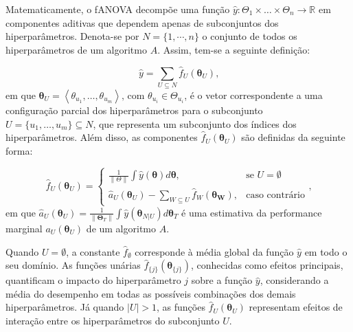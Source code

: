 \documentclass[
  12pt,
  a4paper,
]{scrreprt}
\begin{document}
\vspace{12pt}

Matematicamente, o fANOVA decompõe uma função
\(\hat y: \Theta_{1} \times \dots \times \Theta_{n} \rightarrow \mathbb{R}\)
em componentes aditivas que dependem apenas de subconjuntos dos
hiperparâmetros. Denota-se por \(N=\{1,\cdots,n\}\) o conjunto de todos
os hiperparâmetros de um algoritmo \(A\). Assim, tem-se a seguinte
definição:

\[
\hat{y} = \sum_{U \subseteq N} \hat{f}_{U} \left(\boldsymbol{\theta}_{U}\right)\text{,}
\] em que
\(\boldsymbol{\theta}_U = \left<\theta_{u_{1}}, \dots, \theta_{u_{m}}\right> \text{, com } \theta_{u_i} \in \Theta_{u_i}\),
é o vetor correspondente a uma configuração parcial dos hiperparâmetros
para o subconjunto \(U = \{u_{1}, \dots, u_{m}\} \subseteq N\), que
representa um subconjunto dos índices dos hiperparâmetros. Além disso,
as componentes \(\hat{f}_{U} \left(\boldsymbol{\theta}_{U}\right)\) são
definidas da seguinte forma:

\[
\hat{f}_{U} \left(\boldsymbol{\theta}_{U}\right)=
\begin{cases}
  \frac{1}{\|\Theta\|} \int \hat{y} \left(\boldsymbol{\theta}\right) d\boldsymbol{\theta}, & \text{se } U= \emptyset \\
  \hat{a}_{U}\left(\boldsymbol{\theta}_U\right) - \sum_{W \subseteq U} \hat{f}_{W}\left(\boldsymbol{\theta_{W}}\right), & \text{caso contrário}
\end{cases}\text{,}
\] em que
\(\hat{a}_{U}\left(\boldsymbol{\theta}_U\right) = \frac{1}{\|\boldsymbol{\Theta}_{T}\|} \int \hat{y}\left(\boldsymbol{\theta}_{N|U}\right)d \boldsymbol{\theta}_{T}\)
é uma estimativa da performance marginal
\(a_U\left(\boldsymbol{\theta}_U\right)\) de um algoritmo \(A\).

\vspace{12pt}

Quando \(U = \emptyset\), a constante
\(\hat{f}_{\emptyset}\)\hspace{0pt} corresponde à média global da função
\(\hat y\)\hspace{0pt} em todo o seu domínio. As funções unárias
\(\hat{f}_{\{j\}}\left(\boldsymbol{\theta}_{\{j\}}\right)\), conhecidas
como efeitos principais, quantificam o impacto do hiperparâmetro \(j\)
sobre a função \(\hat y\)\hspace{0pt}, considerando a média do
desempenho em todas as possíveis combinações dos demais hiperparâmetros.
Já quando \(|U| > 1\), as funções
\(\hat{f}_{U}\left(\boldsymbol{\theta}_U\right)\) representam efeitos de
interação entre os hiperparâmetros do subconjunto \(U\).
\end{document}
